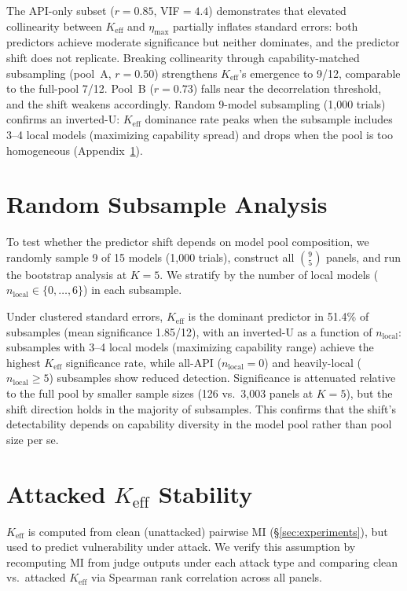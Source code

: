 The API-only subset ($r{=}0.85$, VIF${=}4.4$) demonstrates that elevated collinearity between $K_{\mathrm{eff}}$ and $\eta_{\max}$ partially inflates standard errors: both predictors achieve moderate significance but neither dominates, and the predictor shift does not replicate. Breaking collinearity through capability-matched subsampling (pool~A, $r{=}0.50$) strengthens $K_{\mathrm{eff}}$'s emergence to 9/12, comparable to the full-pool 7/12. Pool~B ($r{=}0.73$) falls near the decorrelation threshold, and the shift weakens accordingly. Random 9-model subsampling (1{,}000 trials) confirms an inverted-U: $K_{\mathrm{eff}}$ dominance rate peaks when the subsample includes 3--4 local models (maximizing capability spread) and drops when the pool is too homogeneous (Appendix~\ref{app:random_subsample}).

\section{Random Subsample Analysis}
\label{app:random_subsample}

To test whether the predictor shift depends on model pool composition, we randomly sample 9 of 15 models (1{,}000 trials), construct all $\binom{9}{5}$ panels, and run the bootstrap analysis at $K{=}5$. We stratify by the number of local models ($n_{\mathrm{local}} \in \{0, \ldots, 6\}$) in each subsample.

Under clustered standard errors, $K_{\mathrm{eff}}$ is the dominant predictor in 51.4\% of subsamples (mean significance 1.85/12), with an inverted-U as a function of $n_{\mathrm{local}}$: subsamples with 3--4 local models (maximizing capability range) achieve the highest $K_{\mathrm{eff}}$ significance rate, while all-API ($n_{\mathrm{local}}{=}0$) and heavily-local ($n_{\mathrm{local}}{\geq}5$) subsamples show reduced detection. Significance is attenuated relative to the full pool by smaller sample sizes (126 vs.\ 3{,}003 panels at $K{=}5$), but the shift direction holds in the majority of subsamples. This confirms that the shift's detectability depends on capability diversity in the model pool rather than pool size per se.

\section{Attacked $K_{\mathrm{eff}}$ Stability}
\label{app:attacked_keff}

$K_{\mathrm{eff}}$ is computed from clean (unattacked) pairwise MI (\S\ref{sec:experiments}), but used to predict vulnerability under attack. We verify this assumption by recomputing MI from judge outputs under each attack type and comparing clean vs.\ attacked $K_{\mathrm{eff}}$ via Spearman rank correlation across all panels.

